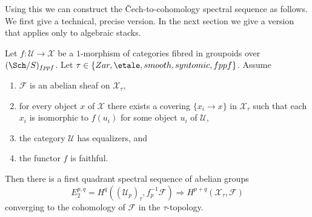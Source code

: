 \noindent
Using this we can construct the {\v C}ech-to-cohomology spectral sequence
as follows. We first give a technical, precise version. In the next section
we give a version that applies only to algebraic stacks.

\begin{lemma}
\label{lemma-cech-to-cohomology}
Let $f : \mathcal{U} \to \mathcal{X}$ be a $1$-morphism of categories fibred
in groupoids over $(\Sch/S)_{fppf}$. Let
$\tau \in \{Zar, \etale, smooth, syntomic, fppf\}$.
Assume
\begin{enumerate}
\item $\mathcal{F}$ is an abelian sheaf on $\mathcal{X}_\tau$,
\item for every object $x$ of $\mathcal{X}$ there exists a covering
$\{x_i \to x\}$ in $\mathcal{X}_\tau$ such that each $x_i$ is isomorphic
to $f(u_i)$ for some object $u_i$ of $\mathcal{U}$,
\item the category $\mathcal{U}$ has equalizers, and
\item the functor $f$ is faithful.
\end{enumerate}
Then there is a first quadrant spectral sequence of abelian groups
$$
E_2^{p, q} = H^q((\mathcal{U}_p)_\tau, f_p^{-1}\mathcal{F})
\Rightarrow
H^{p + q}(\mathcal{X}_\tau, \mathcal{F})
$$
converging to the cohomology of $\mathcal{F}$ in the $\tau$-topology.
\end{lemma}


